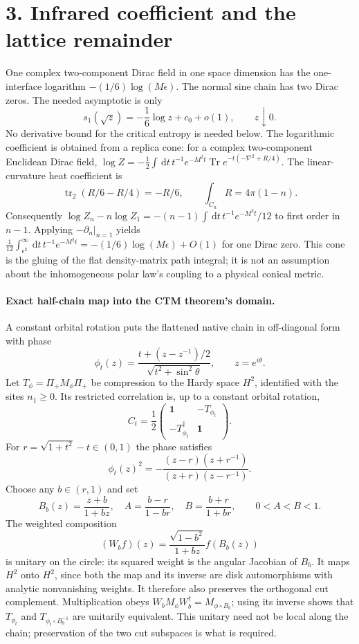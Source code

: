 \documentclass[10pt]{article}
\newcommand{\Tr}{\operatorname{Tr}}
\newcommand{\tr}{\operatorname{tr}}
\newcommand{\id}{\mathbf 1}
\newcommand{\dd}{\,\mathrm d}
\begin{document}
\section*{3. Infrared coefficient and the lattice remainder}
One complex two-component Dirac field in one space dimension has
the one-interface logarithm $-(1/6)\log(M\epsilon)$. The
normal sine chain has two Dirac zeros. The needed asymptotic is
only
\begin{equation}
 s_1(\sqrt z)=-\frac16\log z+c_0+o(1),\qquad z\downarrow0.
 \label{eq:s-chainlog}
\end{equation}
No derivative bound for the critical entropy is needed below.
The logarithmic coefficient is obtained from a replica cone: for a
complex two-component Euclidean Dirac field,
$\log Z=-\tfrac12\int \dd t\,t^{-1}e^{-M^2t}
\Tr e^{-t(-\nabla^2+R/4)}$. The linear-curvature heat coefficient is
\[
 \tr_2(R/6-R/4)=-R/6,
 \qquad \int_{C_n}R=4\pi(1-n).
\]
Consequently
$\log Z_n-n\log Z_1=-(n-1)\int\dd t\,t^{-1}e^{-M^2t}/12$
to first order in $n-1$. Applying $-\partial_n|_{n=1}$ yields
$\tfrac1{12}\int_{\epsilon^2}^{\infty}\dd t\,t^{-1}e^{-M^2t}
=-(1/6)\log(M\epsilon)+O(1)$ for one Dirac zero.
This cone is the gluing of the flat density-matrix path integral;
it is not an assumption about the inhomogeneous polar law's
coupling to a physical conical metric.

\paragraph{Exact half-chain map into the CTM theorem's domain.}
A constant orbital rotation puts the flattened native chain in
off-diagonal form with phase
\[
 \phi_t(z)=\frac{t+(z-z^{-1})/2}{\sqrt{t^2+\sin^2\theta}},
 \qquad z=e^{i\theta}.
\]
Let $T_\phi=\Pi_+M_\phi\Pi_+$ be compression to the Hardy
space $H^2$, identified with the sites $n_1\ge0$. Its restricted
correlation is, up to a constant orbital rotation,
\begin{equation}
 C_t=\frac12
 \begin{pmatrix}\id&-T_{\phi_t}\\-T_{\phi_t}^{\dagger}&\id\end{pmatrix}.
 \label{eq:s-toeplitz-cut}
\end{equation}
For $r=\sqrt{1+t^2}-t\in(0,1)$ the phase satisfies
\[
 \phi_t(z)^2=-\frac{(z-r)(z+r^{-1})}{(z+r)(z-r^{-1})}.
\]
Choose any $b\in(r,1)$ and set
\[
 B_b(z)=\frac{z+b}{1+bz},\quad
 A=\frac{b-r}{1-br},\quad B=\frac{b+r}{1+br},\qquad
 0<A<B<1.
\]
The weighted composition
\[
 (W_bf)(z)=\frac{\sqrt{1-b^2}}{1+bz}f(B_b(z))
\]
is unitary on the circle: its squared weight is the angular
Jacobian of $B_b$. It maps $H^2$ onto $H^2$, since both the map
and its inverse are disk automorphisms with analytic nonvanishing
weights. It therefore also preserves the orthogonal cut complement.
Multiplication obeys
$W_bM_\phi W_b^{\dagger}=M_{\phi\circ B_b}$; using its inverse
shows that $T_{\phi_t}$ and $T_{\phi_t\circ B_b^{-1}}$ are
unitarily equivalent. This unitary need not be local along the
chain; preservation of the two cut subspaces is what is required.
\end{document}
